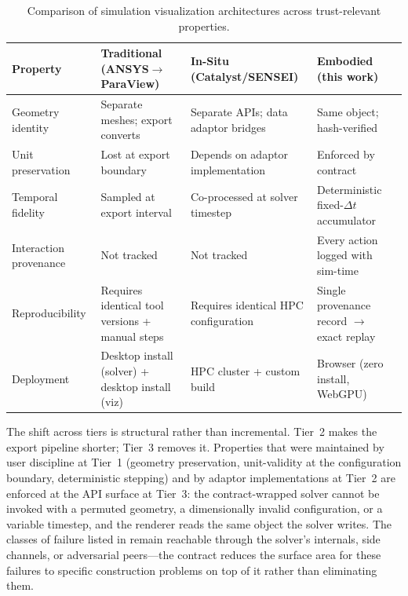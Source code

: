 \documentclass[journal]{IEEEtran}
\begin{document}
\begin{table}[t]
  \centering
  \caption{Comparison of simulation visualization architectures across
    trust-relevant properties.}
  \label{tab:comparison}
  \begin{tabular}{@{}lp{4cm}p{4cm}p{4cm}@{}}
    \toprule
    \textbf{Property} & \textbf{Traditional} (ANSYS$\to$ParaView) &
      \textbf{In-Situ} (Catalyst/SENSEI) &
      \textbf{Embodied} (this work) \\
    \midrule
    Geometry identity &
      Separate meshes; export converts &
      Separate APIs; data adaptor bridges &
      Same object; hash-verified \\
    Unit preservation &
      Lost at export boundary &
      Depends on adaptor implementation &
      Enforced by contract \\
    Temporal fidelity &
      Sampled at export interval &
      Co-processed at solver timestep &
      Deterministic fixed-$\Delta t$ accumulator \\
    Interaction provenance &
      Not tracked &
      Not tracked &
      Every action logged with sim-time \\
    Reproducibility &
      Requires identical tool versions + manual steps &
      Requires identical HPC configuration &
      Single provenance record $\to$ exact replay \\
    Deployment &
      Desktop install (solver) + desktop install (viz) &
      HPC cluster + custom build &
      Browser (zero install, WebGPU) \\
    \bottomrule
  \end{tabular}
\end{table}

The shift across tiers is structural rather than incremental. Tier~2
makes the export pipeline shorter; Tier~3 removes it. Properties that
were maintained by user discipline at Tier~1 (geometry preservation,
unit-validity at the configuration boundary, deterministic stepping)
and by adaptor implementations at Tier~2 are enforced at the API
surface at Tier~3: the contract-wrapped solver cannot be invoked with
a permuted geometry, a dimensionally invalid configuration, or a
variable timestep, and the renderer reads the same object the solver
writes. The classes of failure listed in 
remain reachable through the solver's internals, side channels, or
adversarial peers---the contract reduces the surface area for these
failures to specific construction problems on top of it rather than
eliminating them.
\end{document}
